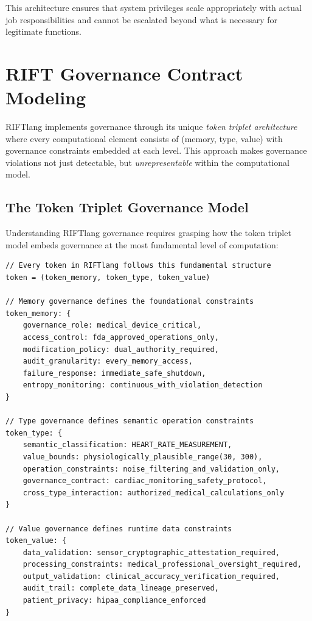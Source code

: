 This architecture ensures that system privileges scale appropriately with actual job responsibilities and cannot be escalated beyond what is necessary for legitimate functions.

\section{RIFT Governance Contract Modeling}

RIFTlang implements governance through its unique \textit{token triplet architecture} where every computational element consists of (memory, type, value) with governance constraints embedded at each level. This approach makes governance violations not just detectable, but \textit{unrepresentable} within the computational model.

\subsection{The Token Triplet Governance Model}

Understanding RIFTlang governance requires grasping how the token triplet model embeds governance at the most fundamental level of computation:

\begin{lstlisting}[language=rift, caption=Token Triplet with Embedded Governance]
// Every token in RIFTlang follows this fundamental structure
token = (token_memory, token_type, token_value)

// Memory governance defines the foundational constraints
token_memory: {
    governance_role: medical_device_critical,
    access_control: fda_approved_operations_only,
    modification_policy: dual_authority_required,
    audit_granularity: every_memory_access,
    failure_response: immediate_safe_shutdown,
    entropy_monitoring: continuous_with_violation_detection
}

// Type governance defines semantic operation constraints  
token_type: {
    semantic_classification: HEART_RATE_MEASUREMENT,
    value_bounds: physiologically_plausible_range(30, 300),
    operation_constraints: noise_filtering_and_validation_only,
    governance_contract: cardiac_monitoring_safety_protocol,
    cross_type_interaction: authorized_medical_calculations_only
}

// Value governance defines runtime data constraints
token_value: {
    data_validation: sensor_cryptographic_attestation_required,
    processing_constraints: medical_professional_oversight_required,
    output_validation: clinical_accuracy_verification_required,
    audit_trail: complete_data_lineage_preserved,
    patient_privacy: hipaa_compliance_enforced
}
\end{lstlisting}


